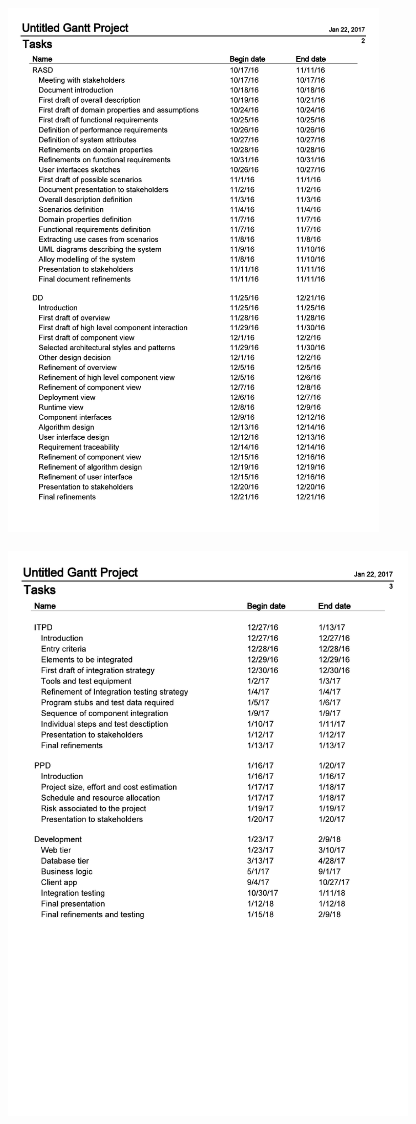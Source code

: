 \begin{figure}[H]
	\centerline{
		\includegraphics[width=371px]{../Datas/schedule-dates-1.pdf}
	}
		\label{fig:tasks-2}
\end{figure}

\begin{figure}[H]
	\centerline{
		\includegraphics[width=400px]{../Datas/schedule-dates-2.pdf}
	}
		\label{fig:tasks-2}
\end{figure}
